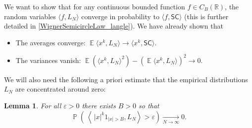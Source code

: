 \documentclass[letterpaper,11pt,oneside,reqno]{amsart}
\numberwithin{equation}{section}
\newcommand{\SC}{\mathsf{SC}}
\DeclareMathOperator{\EE}{\mathbb{E}}
\DeclareMathOperator{\PP}{\mathbb{P}}
\newtheorem{lemma}[proposition]{Lemma}
\theoremstyle{definition}
\begin{document}
We want to show that for any continuous bounded function $f\in C_B(\mathbb R)$, the random
variables $\langle f, L_N\rangle$ converge in probability to 
$\langle f, \SC\rangle$ (this is further detailed in \eqref{WignerSemicircleLaw_langle}).
We have already shown that 
\begin{itemize}
	\item The averages converge: $\EE\langle x^{k}, L_N\rangle\to\langle x^k,\SC\rangle$.
	\item The variances
	vanish: 
	$\EE ( \langle x^k , L_N \rangle^2 ) - ( \EE \langle x^k , L_N \rangle )^2 \to0.$
\end{itemize}

We will also need the following a priori estimate that the empirical distributions
$L_N$ are concentrated around zero:
\begin{lemma}
	For all $ \varepsilon > 0 $ there exists $ B>0 $ so that
	\begin{equation*}
		\PP \left( \, \left \langle \, | x |^k 1_{ | x | > B } , L_N \right \rangle > \varepsilon \right) \xrightarrow[ N \to \infty ]{} 0.
	\end{equation*}
\end{lemma}
\end{document}
